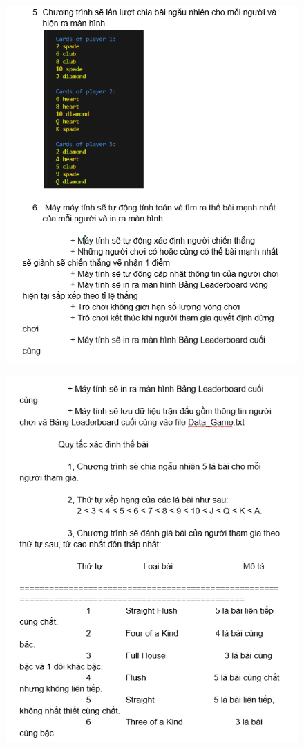 \documentclass{article}
\begin{document}
    \begin{figure}
        \centering
        \includegraphics[width=1\textwidth]{images/screenshot/4_a_6.png}
    \end{figure}
    \begin{figure}
        \centering
        \includegraphics[width=1\textwidth]{images/screenshot/4_a_7.png}
    \end{figure}
\end{document}
